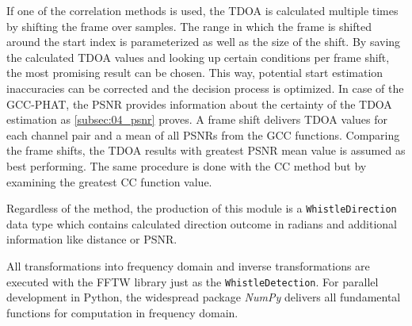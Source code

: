 If one of the correlation methods is used, the \ac{TDOA} is calculated
multiple times by shifting the frame over samples.
The range in which the frame is shifted around the start index is parameterized
as well as the size of the shift. 
By saving the calculated \ac{TDOA} values and looking up  certain conditions per frame shift,
the most promising  result can be chosen.
This way, potential start estimation inaccuracies can be corrected and
the decision process is optimized.
In case of the \ac{GCC-PHAT}, the \ac{PSNR} provides information about
the certainty of the \ac{TDOA} estimation as \cref{subsec:04_psnr} proves.
A frame shift delivers \ac{TDOA} values for each channel pair and a
mean of all \acp{PSNR} from the \ac{GCC} functions.
Comparing the frame shifts, the \ac{TDOA} results with
greatest \ac{PSNR} mean value is assumed as best performing.
The same procedure is done with the \ac{CC} method but by examining
the greatest \ac{CC} function value.

Regardless of the method, the production of this module is a
\lstinline!WhistleDirection! data type which contains calculated
direction outcome in radians and additional information like distance or \ac{PSNR}.

All transformations into frequency domain and inverse transformations
are executed with the \ac{FFTW} library just as the \lstinline!WhistleDetection!.
For parallel development in Python, the widespread package \textit{NumPy}  delivers
all fundamental functions for computation in frequency domain.






